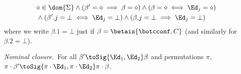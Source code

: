 \begin{definition}
\begin{compactitem}
\begin{align*}
&    \diamond\in\dom{\Sigma}\land (\beta'=\diamond\implies\beta=\diamond) \land
    (\beta=\diamond\iff\Ed_j=\diamond) \\
&{}\land    (\beta'.j=\bot\iff \Ed_j=\bot) \land
(\beta.j=\bot\implies
    \Ed_j=\bot)
  \end{align*}
  where we write $\beta.1=\bot$ just if $\beta=\betais{\botcconf,C}$ (and similarly for $\beta.2=\bot$).
\item \emph{Nominal closure}.~For  all $\beta'\toSig{\Ed_1,\Ed_2}\beta$ and permutations $\pi$, \
$\pi\cdot\beta'\toSig{\pi\cdot\Ed_1,\pi\cdot\Ed_2}\pi\cdot\beta$.
\end{compactitem}
%
\end{definition}

